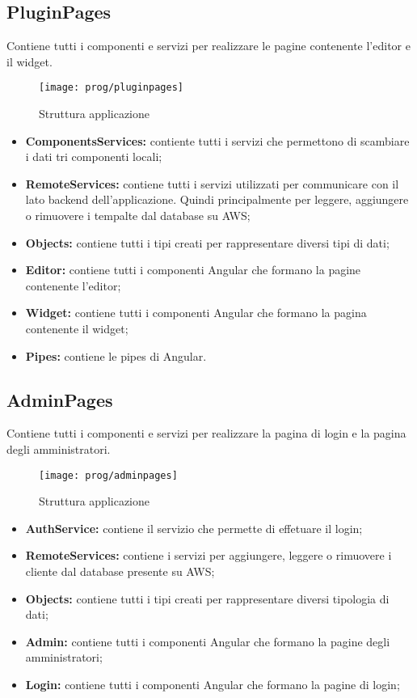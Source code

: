 \subsection{PluginPages}
Contiene tutti i componenti e servizi per realizzare le pagine contenente l'editor e il widget.
\begin{figure}[!h] 
	\centering 
	\texttt{[image: prog/pluginpages]} 
	\caption{Struttura applicazione}
\end{figure}
\begin{itemize}
	\item \textbf{ComponentsServices:} contiente tutti i servizi che permettono di scambiare i dati tri componenti locali;
	\item \textbf{RemoteServices:} contiene tutti i servizi utilizzati per communicare con il lato backend dell'applicazione. Quindi principalmente per leggere, aggiungere o rimuovere i tempalte dal database su AWS;
	\item \textbf{Objects:} contiene tutti i tipi creati per rappresentare diversi tipi di dati;
	\item \textbf{Editor:} contiene tutti i componenti Angular che formano la pagine contenente l'editor;
	\item \textbf{Widget:} contiene tutti i componenti Angular che formano la pagina contenente il widget;
	\item \textbf{Pipes:} contiene le pipes di  Angular.
\end{itemize}
\newpage
\subsection{AdminPages}
Contiene tutti i componenti e servizi per realizzare la pagina di login e la pagina degli amministratori.
\begin{figure}[!h] 
	\centering 
	\texttt{[image: prog/adminpages]} 
	\caption{Struttura applicazione}
\end{figure}
\begin{itemize}
	\item \textbf{AuthService:} contiene il servizio che permette di effetuare il login;
	\item \textbf{RemoteServices:} contiene i servizi per aggiungere, leggere o rimuovere i cliente dal database presente su AWS;
	\item \textbf{Objects:} contiene tutti i tipi creati per rappresentare diversi tipologia di dati;
	\item \textbf{Admin:} contiene tutti i componenti Angular che formano la pagine degli amministratori;
	\item \textbf{Login:} contiene tutti i componenti Angular che formano la pagine di login;
\end{itemize}

